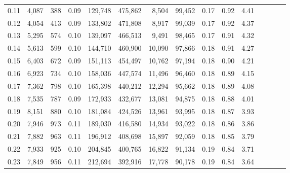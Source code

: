 \begin{tabular}{rrrcrrrrrrrrrrr}
0.11 &   4,087 &     388 &                                       0.09 &  129,748 &  475,862 &    8,504 &   99,452 &  0.17 &  0.92 &                         4.41 \\
0.12 &   4,054 &     413 &                                       0.09 &  133,802 &  471,808 &    8,917 &   99,039 &  0.17 &  0.92 &                         4.37 \\
0.13 &   5,295 &     574 &                                       0.10 &  139,097 &  466,513 &    9,491 &   98,465 &  0.17 &  0.91 &                         4.32 \\
0.14 &   5,613 &     599 &                                       0.10 &  144,710 &  460,900 &   10,090 &   97,866 &  0.18 &  0.91 &                         4.27 \\
0.15 &   6,403 &     672 &                                       0.09 &  151,113 &  454,497 &   10,762 &   97,194 &  0.18 &  0.90 &                         4.21 \\
0.16 &   6,923 &     734 &                                       0.10 &  158,036 &  447,574 &   11,496 &   96,460 &  0.18 &  0.89 &                         4.15 \\
0.17 &   7,362 &     798 &                                       0.10 &  165,398 &  440,212 &   12,294 &   95,662 &  0.18 &  0.89 &                         4.08 \\
0.18 &   7,535 &     787 &                                       0.09 &  172,933 &  432,677 &   13,081 &   94,875 &  0.18 &  0.88 &                         4.01 \\
0.19 &   8,151 &     880 &                                       0.10 &  181,084 &  424,526 &   13,961 &   93,995 &  0.18 &  0.87 &                         3.93 \\
0.20 &   7,946 &     973 &                                       0.11 &  189,030 &  416,580 &   14,934 &   93,022 &  0.18 &  0.86 &                         3.86 \\
0.21 &   7,882 &     963 &                                       0.11 &  196,912 &  408,698 &   15,897 &   92,059 &  0.18 &  0.85 &                         3.79 \\
0.22 &   7,933 &     925 &                                       0.10 &  204,845 &  400,765 &   16,822 &   91,134 &  0.19 &  0.84 &                         3.71 \\
0.23 &   7,849 &     956 &                                       0.11 &  212,694 &  392,916 &   17,778 &   90,178 &  0.19 &  0.84 &                         3.64 \\

\end{tabular}
